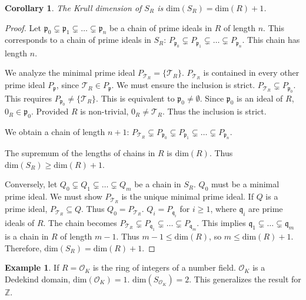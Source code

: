 \documentclass[11pt, a4paper]{article}
\theoremstyle{plain}
\newtheorem{corollary}[theorem]{Corollary}
\theoremstyle{definition}
\newtheorem{example}[theorem]{Example}
\numberwithin{equation}{section}
\newcommand{\Z}{\mathbb{Z}}
\newcommand{\Tobj}{\mathcal{T}} %
\newcommand{\OK}{\mathcal{O}_K}
\newcommand{\SOK}{S_{\mathcal{O}_K}}
\newcommand{\SR}{S_{R}}
\newcommand{\KrullDim}{\mathrm{dim}}
\begin{document}
\begin{corollary}\label{cor:krull_dim_SR}
The Krull dimension of $\SR$ is $\KrullDim(\SR) = \KrullDim(R) + 1$.
\end{corollary}
\begin{proof}
Let $\mathfrak{p}_0 \subsetneq \mathfrak{p}_1 \subsetneq \dots \subsetneq \mathfrak{p}_n$ be a chain of prime ideals in $R$ of length $n$.
This corresponds to a chain of prime ideals in $\SR$:
$P_{\mathfrak{p}_0} \subsetneq P_{\mathfrak{p}_1} \subsetneq \dots \subsetneq P_{\mathfrak{p}_n}$.
This chain has length $n$.

We analyze the minimal prime ideal $P_{\Tobj_R} = \{\Tobj_R\}$.
$P_{\Tobj_R}$ is contained in every other prime ideal $P_{\mathfrak{p}}$, since $\Tobj_R \in P_{\mathfrak{p}}$.
We must ensure the inclusion is strict. $P_{\Tobj_R} \subsetneq P_{\mathfrak{p}_0}$. This requires $P_{\mathfrak{p}_0} \neq \{\Tobj_R\}$. This is equivalent to $\mathfrak{p}_0 \neq \emptyset$. Since $\mathfrak{p}_0$ is an ideal of $R$, $0_R \in \mathfrak{p}_0$. Provided $R$ is non-trivial, $0_R \neq \Tobj_R$. Thus the inclusion is strict.

We obtain a chain of length $n+1$:
$P_{\Tobj_R} \subsetneq P_{\mathfrak{p}_0} \subsetneq P_{\mathfrak{p}_1} \subsetneq \dots \subsetneq P_{\mathfrak{p}_n}$.

The supremum of the lengths of chains in $R$ is $\KrullDim(R)$. Thus $\KrullDim(\SR) \ge \KrullDim(R)+1$.

Conversely, let $Q_0 \subsetneq Q_1 \subsetneq \dots \subsetneq Q_m$ be a chain in $\SR$.
$Q_0$ must be a minimal prime ideal. We must show $P_{\Tobj_R}$ is the unique minimal prime ideal. If $Q$ is a prime ideal, $P_{\Tobj_R} \subseteq Q$. Thus $Q_0=P_{\Tobj_R}$.
$Q_i = P_{\mathfrak{q}_i}$ for $i\ge 1$, where $\mathfrak{q}_i$ are prime ideals of $R$.
The chain becomes $P_{\Tobj_R} \subsetneq P_{\mathfrak{q}_1} \subsetneq \dots \subsetneq P_{\mathfrak{q}_m}$.
This implies $\mathfrak{q}_1 \subsetneq \dots \subsetneq \mathfrak{q}_m$ is a chain in $R$ of length $m-1$.
Thus $m-1 \le \KrullDim(R)$, so $m \le \KrullDim(R)+1$.
Therefore, $\KrullDim(\SR) = \KrullDim(R)+1$.
\end{proof}

\begin{example}
If $R=\OK$ is the ring of integers of a number field. $\OK$ is a Dedekind domain, $\KrullDim(\OK)=1$. $\KrullDim(\SOK)=2$. This generalizes the result for $\Z$.
\end{example}
\end{document}
